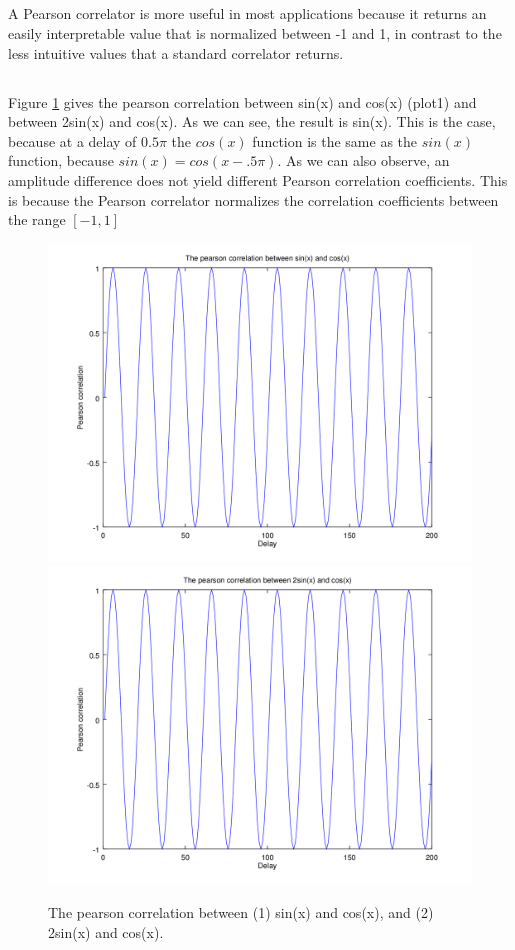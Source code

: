 \documentclass{article}
\begin{document}
\subsection{}
A Pearson correlator is more useful in most applications because it returns an easily interpretable value that is normalized between -1 and 1, in contrast to the less intuitive values that a standard correlator returns.

\subsection{}
Figure \ref{fig:1f} gives the pearson correlation between sin(x) and cos(x) (plot1) and between 2sin(x) and cos(x). As we can see, the result is sin(x). This is the case, because at a delay of $0.5\pi$ the $cos(x)$ function is the same as the $sin(x)$ function, because $sin(x) = cos(x-.5\pi)$. As we can also observe, an amplitude difference does not yield different Pearson correlation coefficients. This is because the Pearson correlator normalizes the correlation coefficients between the range $[-1,1]$
\begin{figure}[H]
	\centering
	\includegraphics[width=.49\textwidth]{plot1f1.png}
	\includegraphics[width=.49\textwidth]{plot1f2.png}
	\caption{The pearson correlation between (1) sin(x) and cos(x), and (2) 2sin(x) and cos(x).}
	\label{fig:1f}
\end{figure}
\end{document}
